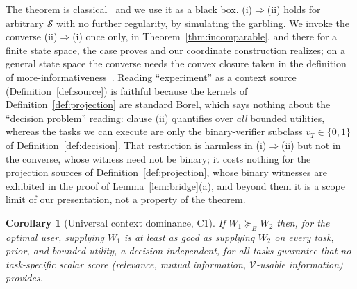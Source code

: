 \documentclass[11pt]{article}
\theoremstyle{plain}
\newtheorem{corollary}{Corollary}
\theoremstyle{definition}
\theoremstyle{remark}
\newcommand{\Scal}{\mathcal{S}}
\newcommand{\Vcal}{\mathcal{V}}
\newcommand{\Bord}{\succeq_{B}}
\begin{document}
\noindent The theorem is classical~\citep{blackwell1953,torgersen1991} and we use it as a black
box. \textup{(i)}$\Rightarrow$\textup{(ii)} holds for arbitrary $\Scal$ with no further regularity,
by simulating the garbling. We invoke the converse \textup{(ii)}$\Rightarrow$\textup{(i)} once
only, in Theorem~\ref{thm:incomparable}, and there for a finite state space, the case
\citet{blackwell1953} proves and our coordinate construction realizes; on a general state space the
converse needs the convex closure taken in the definition of
more-informativeness~\citep{khan2025blackwell}. Reading ``experiment'' as a context source (Definition~\ref{def:source}) is faithful because the
kernels of Definition~\ref{def:projection} are standard Borel, which says nothing about the
``decision problem'' reading: clause \textup{(ii)} quantifies over \emph{all} bounded utilities,
whereas the tasks we can execute are only the binary-verifier subclass $v_T\in\{0,1\}$ of
Definition~\ref{def:decision}. That restriction is harmless in
\textup{(i)}$\Rightarrow$\textup{(ii)} but not in the converse, whose witness need not be binary;
it costs nothing for the projection sources of Definition~\ref{def:projection}, whose binary
witnesses are exhibited in the proof of Lemma~\ref{lem:bridge}\textup{(a)}, and beyond them it is
a scope limit of our presentation, not a property of the theorem.

\begin{corollary}[Universal context dominance, C1]
\label{cor:c1}
If $W_1 \Bord W_2$ then, for the \emph{optimal} user, supplying $W_1$ is at least as good as
supplying $W_2$ on \emph{every} task, prior, and bounded utility, a decision-independent,
for-all-tasks guarantee that no task-specific scalar score (relevance, mutual information,
$\Vcal$-usable information) provides.
\end{corollary}
\end{document}
